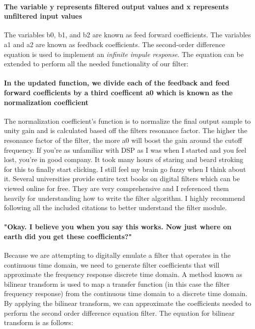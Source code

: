 \documentclass[acmlarge,screen]{acmart}
\begin{document}
	
	\paragraph{The variable y represents filtered output values and x represents unfiltered input values} The variables b0, b1, and b2 are known as feed forward coefficients. The variables a1 and a2 are known as feedback coefficients. The second-order difference equation is used to implement an \textit{infinite impule response}. The equation can be extended to perform all the needed functionality of our filter:
	
	
	\paragraph{In the updated function, we divide each of the feedback and feed forward coefficients by a third coefficent a0 which is known as the normalization coefficient} The normalization coefficient's function is to normalize the final output sample to unity gain and is calculated based off the filters resonance factor. The higher the resonance factor of the filter, the more a0 will boost the gain around the cutoff frequency. If you're as unfamiliar with DSP as I was when I started and you feel lost, you're in good company. It took many hours of staring and beard stroking for this to finally start clicking. I still feel my brain go fuzzy when I think about it. Several universities provide entire text books on digital filters which can be viewed online for free. They are very comprehensive and I referenced them heavily for understanding how to write the filter algorithm. I highly recommend following all the included citations to better understand the filter module. \cite{lacamera_2020}
	
	\paragraph{"Okay. I believe you when you say this works. Now just where on earth did you get these coefficients?"} Because we are attempting to digitally emulate a filter that operates in the continuous time domain, we need to generate filter coefficients that will approximate the frequency response discrete time domain. A method known as bilinear transform is used to map a transfer function (in this case the filter frequency response) from the continuous time domain to a discrete time domain. By applying the bilinear transform, we can approximate the coefficients needed to perform the second order difference equation filter. The equation for bilinear transform is as follows: \cite{stanford_2007} 
	
\end{document}
